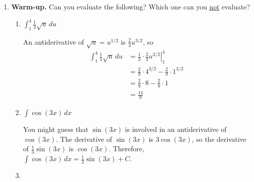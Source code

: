 \documentclass[main]{subfiles}
\begin{document}
\begin{enumerate}
\item 
  \textbf{Warm-up.}  Can you evaluate the following? Which one can you
  \ul{not} evaluate?
  \probonly{}
    \begin{enumerate}

    \item

      \begin{problem}[\vfill]
        $\displaystyle \int_1^4 \frac{1}{3} \sqrt{u}\,du$
      \end{problem}

      \begin{solution}
        An antiderivative of $\sqrt{u} = u^{1/2}$ is $\frac{2}{3}
        u^{3/2}$, so
        \begin{align*}
          \int_1^4 \frac{1}{3} \sqrt{u}\,du &= \left. \frac{1}{3} \cdot
            \frac{2}{3} u^{3/2} \right|_1^4 \\
          &= \frac{2}{9} \cdot 4^{3/2} - \frac{2}{9} \cdot 1^{3/2} \\
          &= \frac{2}{9} \cdot 8 - \frac{2}{9} \cdot 1 \\
          &= \boxed{\frac{14}{9}}
        \end{align*}
      \end{solution}

    \item


      \begin{problem}[\vfill]
        $\displaystyle \int \cos (3x)\,dx$
      \end{problem}

      \begin{solution}
        You might guess that $\sin(3x)$ is involved in an antiderivative
        of $\cos(3x)$.  The derivative of $\sin(3x)$ is $3 \cos(3x)$, so
        the derivative of $\frac{1}{3} \sin(3x)$ is $\cos(3x)$.
        Therefore, $\displaystyle \int \cos(3x)\,dx = \boxed{\frac{1}{3}
          \sin(3x) + C}$. 
      \end{solution}

    \item


\end{enumerate}
\end{enumerate}
\end{document}
